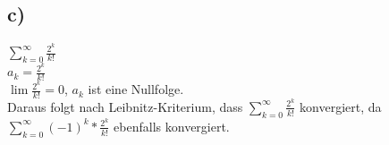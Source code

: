 \documentclass{article}
\begin{document}
	\subsection*{c)}
	$\sum\limits_{k=0}^{\infty}\frac{2^{k}}{k!}$ \\
	$a_{k} = \frac{2^{k}}{k!}$ \\
	$\lim\frac{2^{k}}{k!} = 0$, $a_{k}$ ist eine Nullfolge. \\
	Daraus folgt nach Leibnitz-Kriterium, dass $\sum\limits_{k=0}^{\infty}\frac{2^{k}}{k!}$ konvergiert, da $\sum\limits_{k=0}^{\infty}(-1)^{k}*\frac{2^{k}}{k!}$ ebenfalls konvergiert.
\end{document}
